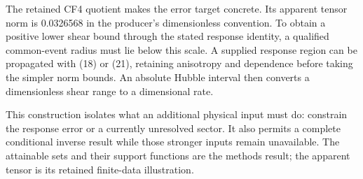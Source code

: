 \documentclass[aps,prd,reprint,onecolumn,11pt,nofootinbib,notitlepage]{revtex4-2}
\begin{document}
The retained CF4 quotient makes the error target concrete. Its apparent tensor norm is 0.0326568 in the producer's dimensionless convention. To obtain a positive lower shear bound through the stated response identity, a qualified common-event radius must lie below this scale. A supplied response region can be propagated with (18) or (21), retaining anisotropy and dependence before taking the simpler norm bounds. An absolute Hubble interval then converts a dimensionless shear range to a dimensional rate.

This construction isolates what an additional physical input must do: constrain the response error or a currently unresolved sector. It also permits a complete conditional inverse result while those stronger inputs remain unavailable. The attainable sets and their support functions are the methods result; the apparent tensor is its retained finite-data illustration.


\appendix


\end{document}
